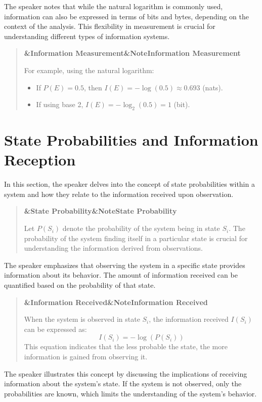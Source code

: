 \documentclass[a4paper]{article}
\newcommand{\boxheading}[1]{%
  \par\smallskip
  \noindent\textbf{\ifx&#1&Note\else#1\fi}\par
  \smallskip
}
\newenvironment{defbox}[1][]{%
  \begin{quote}\color{green!40!black}\boxheading{#1}\normalcolor
}{\end{quote}}
\newenvironment{exbox}[1][]{%
  \begin{quote}\color{brown!70!black}\boxheading{#1}\normalcolor
}{\end{quote}}
\newenvironment{rembox}[1][]{%
  \begin{quote}\color{black!70}\boxheading{#1}\normalcolor
}{\end{quote}}
\begin{document}
The speaker notes that while the natural logarithm is commonly used, information can also be expressed in terms of bits and bytes, depending on the context of the analysis. This flexibility in measurement is crucial for understanding different types of information systems.

\begin{exbox}[Information Measurement]
For example, using the natural logarithm:
\begin{itemize}
    \item If $P(E) = 0.5$, then $I(E) = -\log(0.5) \approx 0.693$ (nats).
    \item If using base 2, $I(E) = -\log_2(0.5) = 1$ (bit).
\end{itemize}
\end{exbox}

\section{State Probabilities and Information Reception}
In this section, the speaker delves into the concept of state probabilities within a system and how they relate to the information received upon observation.

\begin{rembox}[State Probability]
Let \( P(S_i) \) denote the probability of the system being in state \( S_i \). The probability of the system finding itself in a particular state is crucial for understanding the information derived from observations.
\end{rembox}

The speaker emphasizes that observing the system in a specific state provides information about its behavior. The amount of information received can be quantified based on the probability of that state.

\begin{defbox}[Information Received]
When the system is observed in state \( S_i \), the information received \( I(S_i) \) can be expressed as:
\begin{equation}
I(S_i) = -\log(P(S_i))
\end{equation}
This equation indicates that the less probable the state, the more information is gained from observing it.
\end{defbox}

The speaker illustrates this concept by discussing the implications of receiving information about the system's state. If the system is not observed, only the probabilities are known, which limits the understanding of the system's behavior.
\end{document}
